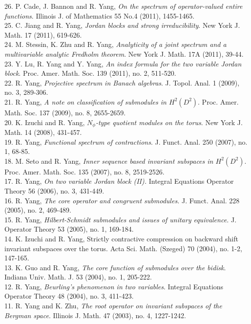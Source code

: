 \documentclass[12pt]{res} %
\begin{document}
\begin{resume}
26. P. Cade, J. Bannon and {R. Yang}, {\em On the spectrum of operator-valued entire functions}. Illinois J. of Mathematics 55 No.4 (2011), 1455-1465.\\
25. C. Jiang and {R. Yang}, {\em Jordan blocks and strong irreducibility}. New York J. Math. 17 (2011), 619-626.\\
24. M. Stessin, K. Zhu and {R. Yang}, {\em Analyticity of a joint spectrum and a multivariable analytic Fredholm theorem}. New York J. Math. 17A (2011), 39-44.\\
23. Y. Lu, R. Yang and {Y. Yang}, {\em An index formula for the two variable Jordan block}. Proc. Amer. Math. Soc. 139 (2011), no. 2, 511-520.\\
22. R. Yang, {\em Projective spectrum in Banach algebras}. J. Topol. Anal. 1 (2009), no. 3, 289-306.\\
21. R. Yang, {\em A note on classification of submodules in $H^2(D^2)$}. Proc. Amer. Math. Soc. 137 (2009), no. 8, 2655-2659.\\
20. {K. Izuchi} and R. Yang, {\em $N_\phi$-type quotient modules on the torus}.  New York J. Math. 14 (2008), 431-457.\\ 
19. R. Yang, {\em Functional spectrum of contractions}. J. Funct. Anal. 250 (2007), no. 1, 68-85. \\
18. {M. Seto} and R. Yang, {\em Inner sequence based invariant subspaces in $H^2(D^2 )$}. Proc. Amer. Math. Soc. 135 (2007), no. 8, 2519-2526.\\
17. R. Yang, {\em On two variable Jordan block (II).} Integral Equations Operator Theory 56 (2006), no. 3, 431-449.\\
16. R. Yang, {\em The core operator and congruent submodules.} J. Funct. Anal. 228 (2005), no. 2, 469-489.\\
15. R. Yang, {\em Hilbert-Schmidt submodules and issues of unitary equivalence.} J. Operator Theory 53 (2005), no. 1, 169-184. \\
14. {K. Izuchi} and R. Yang, Strictly contractive compression on backward shift invariant subspaces over the torus. Acta Sci. Math. (Szeged) 70 (2004), no. 1-2, 147-165.\\
 13. K. Guo and {R. Yang}, {\em The core function of submodules over the bidisk}. Indiana Univ. Math. J. 53 (2004), no. 1, 205-222.\\
12. R. Yang, {\em Beurling's phenomenon in two variables}. Integral Equations Operator Theory 48 (2004), no. 3, 411-423.\\
11. R. Yang and { K. Zhu}, {\em The root operator on invariant subspaces of the Bergman space}. Illinois J. Math. 47 (2003), no. 4, 1227-1242.\\

\end{resume}
\end{document}
